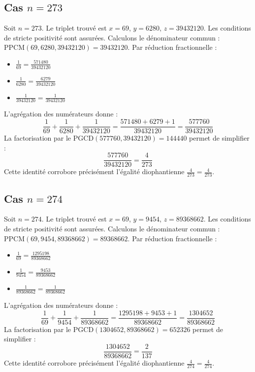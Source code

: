 \documentclass[11pt,a4paper]{article}
\begin{document}
\subsection{Cas $n = 273$}
Soit $n = 273$. Le triplet trouvé est $x = 69$, $y = 6280$, $z = 39432120$.
Les conditions de stricte positivité sont assurées.
Calculons le dénominateur commun : $\text{PPCM}(69, 6280, 39432120) = 39432120$.
Par réduction fractionnelle :
\begin{itemize}
    \item $\frac{1}{69} = \frac{571480}{39432120}$
    \item $\frac{1}{6280} = \frac{6279}{39432120}$
    \item $\frac{1}{39432120} = \frac{1}{39432120}$
\end{itemize}
L'agrégation des numérateurs donne :
$$ \frac{1}{69} + \frac{1}{6280} + \frac{1}{39432120} = \frac{571480 + 6279 + 1}{39432120} = \frac{577760}{39432120} $$
La factorisation par le $\text{PGCD}(577760, 39432120) = 144440$ permet de simplifier :
$$ \frac{577760}{39432120} = \frac{4}{273} $$
Cette identité corrobore précisément l'égalité diophantienne $\frac{4}{273} = \frac{4}{273}$.

\subsection{Cas $n = 274$}
Soit $n = 274$. Le triplet trouvé est $x = 69$, $y = 9454$, $z = 89368662$.
Les conditions de stricte positivité sont assurées.
Calculons le dénominateur commun : $\text{PPCM}(69, 9454, 89368662) = 89368662$.
Par réduction fractionnelle :
\begin{itemize}
    \item $\frac{1}{69} = \frac{1295198}{89368662}$
    \item $\frac{1}{9454} = \frac{9453}{89368662}$
    \item $\frac{1}{89368662} = \frac{1}{89368662}$
\end{itemize}
L'agrégation des numérateurs donne :
$$ \frac{1}{69} + \frac{1}{9454} + \frac{1}{89368662} = \frac{1295198 + 9453 + 1}{89368662} = \frac{1304652}{89368662} $$
La factorisation par le $\text{PGCD}(1304652, 89368662) = 652326$ permet de simplifier :
$$ \frac{1304652}{89368662} = \frac{2}{137} $$
Cette identité corrobore précisément l'égalité diophantienne $\frac{4}{274} = \frac{4}{274}$.
\end{document}
